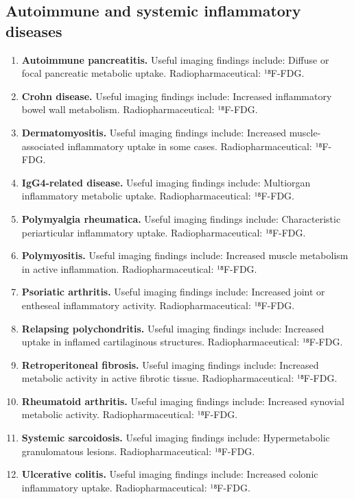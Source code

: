 \subsection{Autoimmune and systemic inflammatory diseases}
\begin{enumerate}[leftmargin=*,itemsep=0.45em,topsep=0.4em]
\item \textbf{Autoimmune pancreatitis.} Useful imaging findings include: Diffuse or focal pancreatic metabolic uptake. Radiopharmaceutical: ¹⁸F-FDG.
\item \textbf{Crohn disease.} Useful imaging findings include: Increased inflammatory bowel wall metabolism. Radiopharmaceutical: ¹⁸F-FDG.
\item \textbf{Dermatomyositis.} Useful imaging findings include: Increased muscle-associated inflammatory uptake in some cases. Radiopharmaceutical: ¹⁸F-FDG.
\item \textbf{IgG4-related disease.} Useful imaging findings include: Multiorgan inflammatory metabolic uptake. Radiopharmaceutical: ¹⁸F-FDG.
\item \textbf{Polymyalgia rheumatica.} Useful imaging findings include: Characteristic periarticular inflammatory uptake. Radiopharmaceutical: ¹⁸F-FDG.
\item \textbf{Polymyositis.} Useful imaging findings include: Increased muscle metabolism in active inflammation. Radiopharmaceutical: ¹⁸F-FDG.
\item \textbf{Psoriatic arthritis.} Useful imaging findings include: Increased joint or entheseal inflammatory activity. Radiopharmaceutical: ¹⁸F-FDG.
\item \textbf{Relapsing polychondritis.} Useful imaging findings include: Increased uptake in inflamed cartilaginous structures. Radiopharmaceutical: ¹⁸F-FDG.
\item \textbf{Retroperitoneal fibrosis.} Useful imaging findings include: Increased metabolic activity in active fibrotic tissue. Radiopharmaceutical: ¹⁸F-FDG.
\item \textbf{Rheumatoid arthritis.} Useful imaging findings include: Increased synovial metabolic activity. Radiopharmaceutical: ¹⁸F-FDG.
\item \textbf{Systemic sarcoidosis.} Useful imaging findings include: Hypermetabolic granulomatous lesions. Radiopharmaceutical: ¹⁸F-FDG.
\item \textbf{Ulcerative colitis.} Useful imaging findings include: Increased colonic inflammatory uptake. Radiopharmaceutical: ¹⁸F-FDG.
\end{enumerate}

